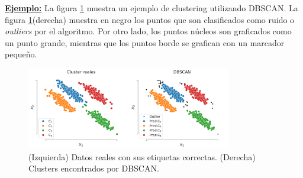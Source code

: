\underline{\textbf{Ejemplo:}} La figura \ref{fig:dbscan} muestra un ejemplo de clustering utilizando DBSCAN. La figura \ref{fig:dbscan}(derecha) muestra en negro los puntos que son clasificados como ruido o \emph{outliers} por el algoritmo. Por otro lado, los puntos núcleos son graficados como un punto grande, mientras que los puntos borde se grafican con un marcador pequeño.

\begin{figure}[H]
  \centering
  \includegraphics[width=0.8\textwidth]{img/cap7_dbscan}
  \caption{(Izquierda) Datos reales con sus etiquetas correctas. (Derecha) Clusters encontrados por DBSCAN.}
  \label{fig:dbscan}
\end{figure}